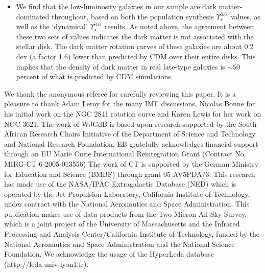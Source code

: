 \documentclass[usenatbib,usegraphicx,apjfonts,floatfix]{emulateapj}
\newcommand{\Ups}{\ensuremath{\Upsilon_{\star}^{3.6}}}
\begin{document}
\begin{itemize}
\item We find that the low-luminosity galaxies in our sample are dark
  matter-dominated throughout, based on both the population synthesis
  \Ups\ values, as well as the `dynamical' \Ups\ results. As noted
  above, the agreement between these two sets of values indicates the
  dark matter is not associated with the stellar disk.  The dark
  matter rotation curves of these galaxies are about 0.2 dex (a factor
  1.6) lower than predicted by CDM over their entire disks. This
  implies that the density of dark matter in real late-type galaxies
  is $\sim 50$ percent of what is predicted by CDM simulations.

\end{itemize}


\acknowledgements

We thank the anonymous referee for carefully reviewing this paper.  It
is a pleasure to thank Adam Leroy for the many IMF discussions,
Nicolas Bonne for his initial work on the NGC 2841 rotation curve and
Karen Lewis for her work on NGC 3621.  The work of WJGdB is based upon
research supported by the South African Research Chairs Initiative of
the Department of Science and Technology and National Research
Foundation.  EB gratefully acknowledges financial support through an
EU Marie Curie International Reintegration Grant (Contract
No. MIRG-CT-6-2005-013556) The work of CT is supported by the German
Ministry for Education and Science (BMBF) through grant 05 AV5PDA/3.
This research has made use of the NASA/IPAC Extragalactic Database
(NED) which is operated by the Jet Propulsion Laboratory, California
Institute of Technology, under contract with the National Aeronautics
and Space Administration.  This publication makes use of data products
from the Two Micron All Sky Survey, which is a joint project of the
University of Massachusetts and the Infrared Processing and Analysis
Center/California Institute of Technology, funded by the National
Aeronautics and Space Administration and the National Science
Foundation.  We acknowledge the usage of the HyperLeda database
(http://leda.univ-lyon1.fr).






\begin{figure}[t]
  \hsize {} \hfil
  \hsize {} \hfil
\end{figure}
\end{document}
